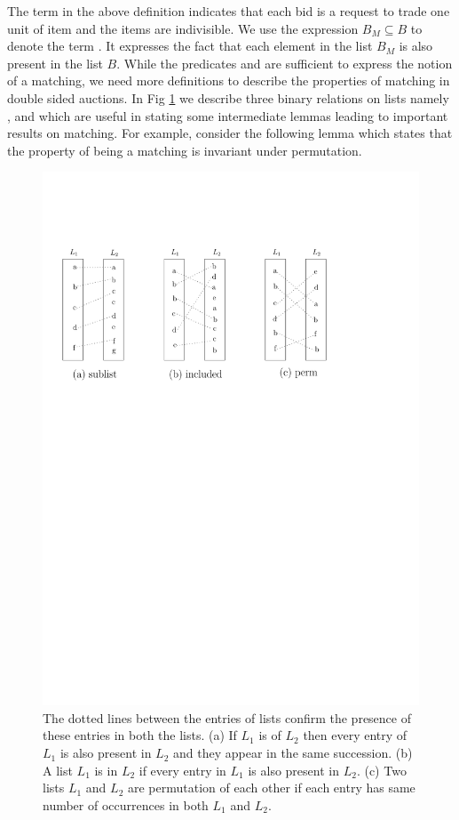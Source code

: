 \documentclass[a4paper,UKenglish,cleveref, autoref]{lipics-v2019}
\begin{document}
\begin{definition}
\end{definition}
The term \emph{} in  the above definition indicates that each bid is a request to trade one unit of item and the items are indivisible.  We use the expression $B_M \subseteq B$  to denote the term .  It expresses the fact that each element in the list $B_M$ is also present in the list $B$. While the predicates  and    are sufficient to express the notion of a matching, we need more definitions to describe the properties of matching in double sided auctions.  In Fig \ref{fig:list} we describe three binary relations on lists namely ,  and  which are useful in stating some intermediate lemmas leading to important results on matching. For example, consider the following lemma which states that the property of being a matching is invariant under permutation. 

\begin{lemma}
\end{lemma}

\begin{figure}[h!]
\centering
\includegraphics[width=.5\textwidth]{sub_inclu_perm.pdf}
\caption{The dotted lines between the entries of lists confirm the presence of these entries in both the lists. (a) If $L_1$ is  of $L_2$ then every entry of $L_1$ is also present in $L_2$ and they appear in the same succession. (b) A list $L_1$ is  in $L_2$ if every entry in $L_1$ is also present in $L_2$. (c) Two lists $L_1$ and $L_2$ are permutation of each other if each entry has same number of occurrences in both  $L_1$ and $L_2$. }
\label{fig:list}
\end{figure}
\end{document}
